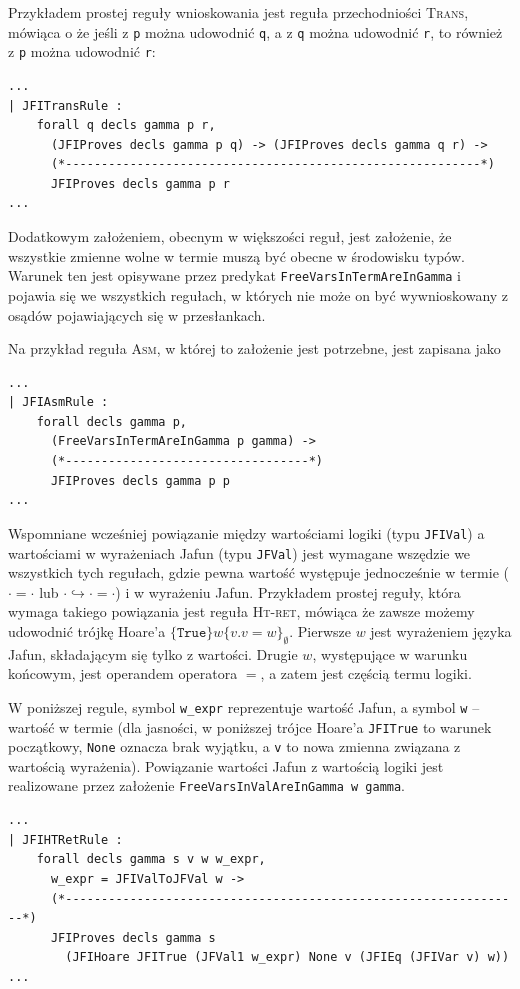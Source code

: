 \documentclass[]{pracamgr}
\newcommand \hoare [5] {\{#1\}#2\{#4.#5\}_#3}
\renewcommand \| {\hspace{0.75em} | \hspace{0.75em} }
\renewcommand \[ {[\![}
\renewcommand \] {]\!]}
\theoremstyle{definition}
\begin{document}
Przykładem prostej reguły wnioskowania jest reguła przechodniości \textsc{Trans}, mówiąca
o że jeśli z \texttt{p} można udowodnić \texttt{q}, a z \texttt{q} można udowodnić
\texttt{r}, to również z \texttt{p} można udowodnić \texttt{r}:
\begin{verbatim}
...
| JFITransRule :
    forall q decls gamma p r,
      (JFIProves decls gamma p q) -> (JFIProves decls gamma q r) ->
      (*----------------------------------------------------------*)
      JFIProves decls gamma p r
...
\end{verbatim}

Dodatkowym założeniem, obecnym w większości reguł, jest założenie, że
wszystkie zmienne wolne w termie muszą być obecne w środowisku typów.
Warunek ten jest opisywane przez predykat \texttt{FreeVarsInTermAreInGamma} i pojawia się
we wszystkich regułach, w których nie może on być wywnioskowany z osądów pojawiających się
w przesłankach.

Na przykład reguła \textsc{Asm}, w której to założenie jest potrzebne, jest zapisana jako
\begin{verbatim}
...
| JFIAsmRule :
    forall decls gamma p,
      (FreeVarsInTermAreInGamma p gamma) ->
      (*----------------------------------*)
      JFIProves decls gamma p p 
...
\end{verbatim}


Wspomniane wcześniej powiązanie między wartościami logiki (typu \texttt{JFIVal}) a wartościami
w wyrażeniach Jafun (typu \texttt{JFVal}) jest wymagane wszędzie we wszystkich tych regułach,
gdzie pewna wartość występuje jednocześnie w termie
($\cdot = \cdot$ lub $\cdot \hookrightarrow \cdot = \cdot$) i w wyrażeniu Jafun.
Przykładem prostej reguły, która wymaga takiego powiązania jest reguła \textsc{Ht-ret},
mówiąca że zawsze możemy udowodnić trójkę Hoare'a
$\hoare{\mathtt{True}}{w}{\emptyset}{v}{v = w}$.
Pierwsze $w$ jest wyrażeniem języka Jafun, składającym się tylko z wartości.
Drugie $w$, występujące w warunku końcowym, jest operandem operatora $=$, a zatem jest
częścią termu logiki.

W poniższej regule, symbol \texttt{w\_expr} reprezentuje wartość Jafun, a
symbol \texttt{w} -- wartość w termie
(dla jasności, w poniższej trójce Hoare'a \texttt{JFITrue} to warunek początkowy,
\texttt{None} oznacza brak wyjątku, a \texttt{v}
to nowa zmienna związana z wartością wyrażenia).
Powiązanie wartości Jafun z wartością logiki jest realizowane przez założenie
\texttt{FreeVarsInValAreInGamma w gamma}.
\begin{verbatim}
...
| JFIHTRetRule :
    forall decls gamma s v w w_expr,
      w_expr = JFIValToJFVal w ->
      (*----------------------------------------------------------------*)
      JFIProves decls gamma s
        (JFIHoare JFITrue (JFVal1 w_expr) None v (JFIEq (JFIVar v) w))
...
\end{verbatim}
\end{document}
